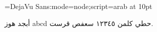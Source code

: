 
\font\aaa={DejaVu Sans:mode=node;script=arab} at 10pt\aaa
%
%

أبجد هوز abcd حطي كلمن ١٢٣٤٥ سعفص قرست.
\bye
